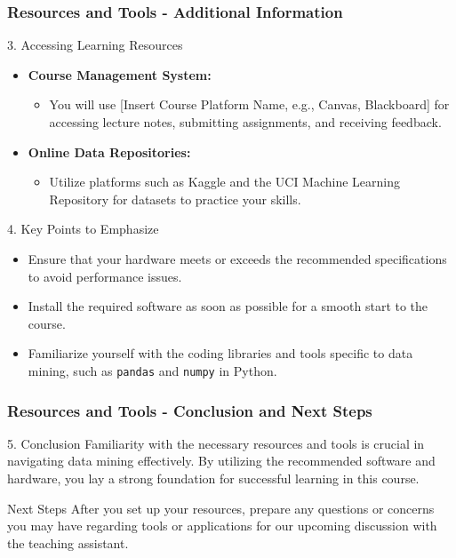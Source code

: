 \documentclass[aspectratio=169]{beamer}
\begin{document}
\begin{frame}[fragile]
    \frametitle{Resources and Tools - Additional Information}
    \begin{block}{3. Accessing Learning Resources}
        \begin{itemize}
            \item \textbf{Course Management System:}
            \begin{itemize}
                \item You will use [Insert Course Platform Name, e.g., Canvas, Blackboard] for accessing lecture notes, submitting assignments, and receiving feedback.
            \end{itemize}
            \item \textbf{Online Data Repositories:}
            \begin{itemize}
                \item Utilize platforms such as Kaggle and the UCI Machine Learning Repository for datasets to practice your skills.
            \end{itemize}
        \end{itemize}
    \end{block}
    \begin{block}{4. Key Points to Emphasize}
        \begin{itemize}
            \item Ensure that your hardware meets or exceeds the recommended specifications to avoid performance issues.
            \item Install the required software as soon as possible for a smooth start to the course.
            \item Familiarize yourself with the coding libraries and tools specific to data mining, such as \texttt{pandas} and \texttt{numpy} in Python.
        \end{itemize}
    \end{block}
\end{frame}

\begin{frame}[fragile]
    \frametitle{Resources and Tools - Conclusion and Next Steps}
    \begin{block}{5. Conclusion}
        Familiarity with the necessary resources and tools is crucial in navigating data mining effectively. By utilizing the recommended software and hardware, you lay a strong foundation for successful learning in this course.
    \end{block}
    \begin{block}{Next Steps}
        After you set up your resources, prepare any questions or concerns you may have regarding tools or applications for our upcoming discussion with the teaching assistant.
    \end{block}
\end{frame}
\end{document}
